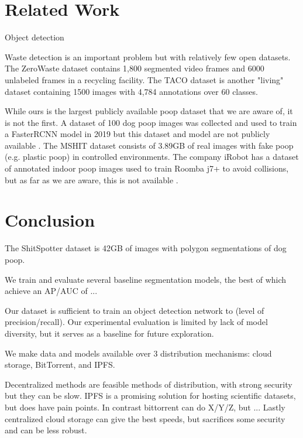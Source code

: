 \documentclass[10pt,twocolumn,letterpaper]{article}
\begin{document}
\section{Related Work}

Object detection

Waste detection is an important problem but with relatively few open datasets.
The ZeroWaste dataset \cite{bashkirova_zerowaste_2022} contains 1,800 segmented
video frames and 6000 unlabeled frames in a recycling facility.
The TACO dataset \cite{proenca_taco_2020} is another "living" dataset
containing 1500 images with 4,784 annotations over 60 classes.


While ours is the largest publicly available poop dataset that we are aware of,
it is not the first.
A dataset of 100 dog poop images was collected and used to train a FasterRCNN
model in 2019 but this dataset and model are not publicly available \cite{neeraj_madan_dog_2019}.
The MSHIT dataset \cite{mshit_2020} consists of 3.89GB of real images with fake
poop (e.g. plastic poop) in controlled environments.
The company iRobot has a dataset of annotated indoor poop images used to train
Roomba j7+ to avoid collisions, but as far as we are aware, this is not
available \cite{roomba_2021}.

\section{Conclusion}

The ShitSpotter dataset is 42GB of images with polygon segmentations of dog
poop. 

We train and evaluate several baseline segmentation models, the best of which 
achieve an AP/AUC of ...

Our dataset is sufficient to train an object detection network to (level of
precision/recall).
Our experimental evaluation is limited by lack of model diversity, but it
serves as a baseline for future exploration.

We make data and models available over 3 distribution mechanisms: 
cloud storage, BitTorrent, and IPFS.

Decentralized methods are feasible methods of distribution, with strong
security but they can be slow.
IPFS is a promising solution for hosting scientific datasets, but does have pain points.
In contrast bittorrent can do X/Y/Z, but ...
Lastly centralized cloud storage can give the best speeds, but sacrifices some
security and can be less robust.
\end{document}
